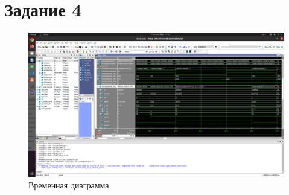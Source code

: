 \section{Задание 4}

\begin{figure}[ht!]
    \centering
    \includegraphics[width=170mm]{./img/task_4.png}
    \caption{Временная диаграмма \label{overflow3}}
\end{figure}